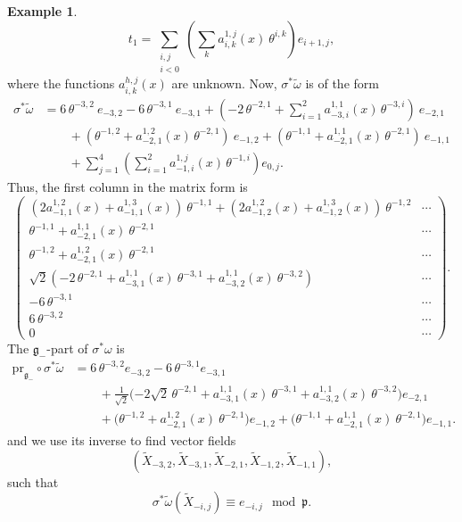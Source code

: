 \documentclass{amsart}
\theoremstyle{plain}
\theoremstyle{definition}
\newtheorem*{example}{Example}
\theoremstyle{remark}
\newcommand{\mfk}[1]{\mathfrak{#1}}
\begin{document}
\begin{example}
    \[t_1 = \sum_{\substack{i,j \\ i<0}} \left( \sum_k a_{i,k}^{1,j} (x)\ \theta^{i,k} \right) e_{i+1,j},\]
    where the functions $a_{i,k}^{h,j} (x)$ are unknown. Now, $\sigma^*\widetilde\omega$ is of the form
    \begin{equation*}
    \begin{aligned}
        \sigma^* \widetilde\omega &=  6\, \theta^{-3,2}\ e_{-3,2} - 6\, \theta^{-3,1}\ e_{-3,1} + \left(-2\, \theta^{-2,1} + \sum_{i=1}^2 a_{-3,i}^{1,1} (x)\, \theta^{-3,i}\right)\ e_{-2,1}\\
        &\qquad + \left( \theta^{-1,2} + a_{-2,1}^{1,2} (x)\, \theta^{-2,1}\right)\ e_{-1,2} + \left( \theta^{-1,1} + a_{-2,1}^{1,1} (x)\, \theta^{-2,1}\right)\ e_{-1,1}\\
        &\qquad + \sum_{j=1}^4 \left( \sum_{i=1}^2 a_{-1,i}^{1,j} (x)\, \theta^{-1,i}\right) e_{0,j}.
    \end{aligned}
    \end{equation*}
    Thus, the first column in the matrix form is
    \begin{equation*}
    \begin{pmatrix}
        (2 a_{-1,1}^{1,2}(x) + a_{-1,1}^{1,3}(x))\ \theta^{-1,1} + (2 a_{-1,2}^{1,2}(x) + a_{-1,2}^{1,3}(x))\ \theta^{-1,2} & \cdots \\
        \theta^{-1,1} + a_{-2,1}^{1,1}(x)\ \theta^{-2,1} & \cdots \\
        \theta^{-1,2} + a_{-2,1}^{1,2}(x)\ \theta^{-2,1} & \cdots \\
        \sqrt{2}(-2\,\theta^{-2,1} + a_{-3,1}^{1,1}(x)\ \theta^{-3,1} + a_{-3,2}^{1,1}(x)\ \theta^{-3,2}) & \cdots\\
        -6\, \theta^{-3,1} & \cdots\\
        6\, \theta^{-3,2} & \cdots \\
        0 & \cdots
    \end{pmatrix}.
    \end{equation*}
    The $\mfk{g}_-$-part of $\sigma^*\omega$ is
    \begin{equation*}
    \begin{aligned}
        \mathrm{pr}_{\mfk{g}_-} \circ \sigma^*\widetilde\omega &= 
        6\, \theta^{-3,2} e_{-3,2}  -6\, \theta^{-3,1} e_{-3,1}\\
        &\qquad {} + \tfrac{1}{\sqrt{2}} \big({-2}\sqrt{2}\,\theta^{-2,1} + a_{-3,1}^{1,1}(x)\ \theta^{-3,1} + a_{-3,2}^{1,1}(x)\ \theta^{-3,2} \big) e_{-2,1}\\ 
        &\qquad {} + \big(\theta^{-1,2} + a_{-2,1}^{1,2}(x)\ \theta^{-2,1} \big) e_{-1,2} + \big( \theta^{-1,1} + a_{-2,1}^{1,1}(x)\ \theta^{-2,1} \big) e_{-1,1}.
    \end{aligned}
    \end{equation*}
    and we use its inverse to find vector fields
    \begin{equation*}
        (\widetilde{X}_{-3,2},\widetilde{X}_{-3,1},\widetilde{X}_{-2,1},\widetilde{X}_{-1,2},\widetilde{X}_{-1,1}),
    \end{equation*}
    such that
    \[ \sigma ^* \widetilde\omega (\widetilde{X}_{-i,j}) \equiv e_{-i,j} \mod \mfk{p}. \]
    

\end{example}
\end{document}
